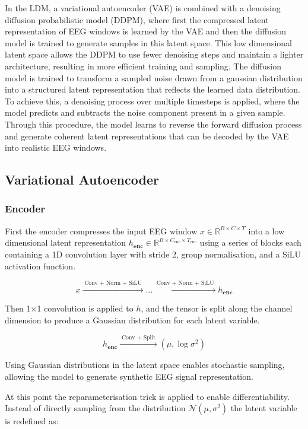 In the LDM, a variational autoencoder (VAE) is combined with a denoising diffusion probabilistic model (DDPM), where first the compressed latent representation of EEG windows is learned by the VAE and then the diffusion model is trained to generate samples in this latent space. This low dimensional latent space allows the DDPM to use fewer denoising steps and maintain a lighter architecture, resulting in more efficient training and sampling. The diffusion model is trained to transform a sampled noise drawn from a gaussian distribution into a structured latent representation that reflects the learned data distribution. To achieve this, a denoising process over multiple timesteps is applied, where the model predicts and subtracts the noise component present in a given sample. Through this procedure, the model learns to reverse the forward diffusion process and generate coherent latent representations that can be decoded by the VAE into realistic EEG windows.

\subsection{Variational Autoencoder}

\subsubsection{Encoder}


First the encoder compresses the input EEG window $x \in \mathbb{R}^{B \times C \times T}$ into a low dimensional latent representation $h_\textbf{enc}  \in \mathbb{R}^{B \times C_\text{enc} \times T_\text{enc}}$ using a series of blocks each containing a 1D convolution layer with stride 2, group normalisation, and a SiLU activation function. 

\[
x \xrightarrow{\;\text{Conv + Norm + SiLU}\;} \ldots \xrightarrow{\;\text{Conv + Norm + SiLU}\;} h_\textbf{enc} 
\]

Then 1$\times$1 convolution is applied to $h$, and the tensor is split along the channel dimension to produce a Gaussian distribution for each latent variable.

\[
h_\textbf{enc}  \xrightarrow{\;\text{Conv + Split}\;} (\mu, \log \sigma^2)
\]

Using Gaussian distributions in the latent space enables stochastic sampling, allowing the model to generate synthetic EEG signal representation. 

At this point the reparameterisation trick is applied to enable differentiability. Instead of directly sampling from the distribution $\mathcal{N}(\mu, \sigma^2)$ the latent variable is redefined as: 

